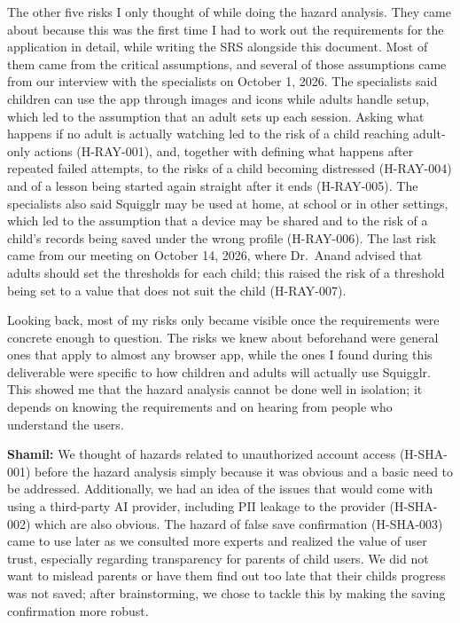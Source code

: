 \documentclass{article}
\begin{document}
\begin{enumerate}
The other five risks I only thought of while doing the hazard analysis. They
came about because this was the first time I had to work out the requirements
for the application in detail, while writing the SRS alongside this document.
Most of them came from the critical assumptions, and several of those
assumptions came from our interview with the specialists on October 1, 2026. The
specialists said children can use the app through images and icons while adults
handle setup, which led to the assumption that an adult sets up each session.
Asking what happens if no adult is actually watching led to the risk of a child
reaching adult-only actions (H-RAY-001), and, together with defining what
happens after repeated failed attempts, to the risks of a child becoming
distressed (H-RAY-004) and of a lesson being started again straight after it ends
(H-RAY-005). The specialists also said Squigglr may be used at home, at school
or in other settings, which led to the assumption that a device may be shared
and to the risk of a child's records being saved under the wrong profile
(H-RAY-006). The last risk came from our meeting on October 14, 2026, where
Dr.~Anand advised that adults should set the thresholds for each child; this
raised the risk of a threshold being set to a value that does not suit the child
(H-RAY-007).

Looking back, most of my risks only became visible once the requirements were
concrete enough to question. The risks we knew about beforehand were general
ones that apply to almost any browser app, while the ones I found during this
deliverable were specific to how children and adults will actually use Squigglr.
This showed me that the hazard analysis cannot be done well in isolation; it
depends on knowing the requirements and on hearing from people who understand
the users.

\textbf{Shamil:} We thought of hazards related to unauthorized account access
(H-SHA-001) before the hazard analysis simply because it was obvious and a basic
need to be addressed. Additionally, we had an idea of the issues that would come
with using a third-party AI provider, including PII leakage to the provider
(H-SHA-002) which are also obvious. The hazard of false save confirmation
(H-SHA-003) came to use later as we consulted more experts and realized the
value of user trust, especially regarding transparency for parents of child
users. We did not want to mislead parents or have them find out too late that
their childs progress was not saved; after brainstorming, we chose to tackle
this by making the saving confirmation more robust.


\end{enumerate}
\end{document}

